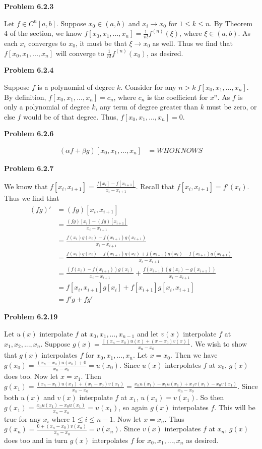 \documentclass{article}
\newcommand{\Problem}[1]{\textbf{Problem #1}}
\begin{document}
\Problem{6.2.3}

Let $f \in C^n[a,b]$. Suppose $x_0 \in (a,b)$ and $x_i \to x_0$ for $1 \leq k \leq n$. By Theorem 4 of the section, we know $f[x_0,x_1,...,x_n] = \frac{1}{n!}f^{(n)}(\xi)$, where $\xi \in (a,b)$. As each $x_i$ converges to $x_0$, it must be that $\xi \to x_0$ as well. Thus we find that $f[x_0,x_1,...,x_n]$ will converge to $\frac{1}{n!}f^{(n)}(x_0)$, as desired.

\Problem{6.2.4}

Suppose $f$ is a polynomial of degree $k$. Consider for any $n > k\ f[x_0,x_1,...,x_n]$. By definition, $f[x_0,x_1,...,x_n] = c_n$, where $c_n$ is the coefficient for $x^n$. As $f$ is only a polynomial of degree $k$, any term of degree greater than $k$ must be zero, or else $f$ would be of that degree. Thus, $f[x_0,x_1,...,x_n] = 0$. 

\Problem{6.2.6}

\begin{align*}
(\alpha f + \beta g)[x_0,x_1,...,x_n] &= WHO KNOWS	
\end{align*}

\Problem{6.2.7}

We know that $f[x_i,x_{i+1}] = \displaystyle\frac{f[x_i] - f[x_{i+1}]}{x_i - x_{i+1}}$. Recall that $f[x_i,x_{i+1}] = f'(x_i)$. Thus we find that
\begin{align*}
(fg)' &= (fg)[x_i,x_{i+1}]\\ 
&= \displaystyle\frac{(fg)[x_i] - (fg)[x_{i+1}]}{x_i - x_{i+1}}	\\
&= \displaystyle\frac{f(x_i)g(x_i) - f(x_{i+1})g(x_{i+1})}{x_i-x_{i+1}}\\
&= \displaystyle\frac{f(x_i)g(x_i) -f(x_{i+1})g(x_i)+f(x_{i+1})g(x_i)- f(x_{i+1})g(x_{i+1})}{x_i-x_{i+1}}\\
&= \displaystyle\frac{(f(x_i)-f(x_{i+1}))g(x_i)}{x_i-x_{i+1}} + \displaystyle\frac{f(x_{i+1})(g(x_i)-g(x_{i+1}))}{x_i-x_{i+1}}\\
&= f[x_i,x_{i+1}]g[x_i] + f[x_{i+1}]g[x_i,x_{i+1}]\\
&= f'g + fg'
\end{align*}

\Problem{6.2.19}

Let $u(x)$ interpolate $f$ at $x_0,x_1,...,x_{n-1}$ and let $v(x)$ interpolate $f$ at $x_1,x_2,...,x_n$. Suppose $g(x) = \displaystyle\frac{[(x_n - x_0)u(x) + (x - x_0)v(x)]}{x_n-x_0}$. We wish to show that $g(x)$ interpolates $f$ for $x_0,x_1,...,x_n$. Let $x = x_0$. Then we have $g(x_0) = \displaystyle\frac{(x_n - x_0)u(x_0) + 0}{x_n - x_0} = u(x_0)$. Since $u(x)$ interpolates $f$ at $x_0$, $g(x)$ does too. Now let $x = x_1$. Then $g(x_1) = \displaystyle\frac{(x_n - x_1)u(x_1) + (x_1-x_0)v(x_1)}{x_n - x_0} = \displaystyle\frac{x_nu(x_1)-x_1u(x_1) + x_1v(x_1) - x_0v(x_1)}{x_n - x_0}$. Since both $u(x)$ and $v(x)$ interpolate $f$ at $x_1$, $u(x_1) = v(x_1)$. So then $g(x_1) = \displaystyle\frac{x_nu(x_1) - x_0u(x_1)}{x_n - x_0} = u(x_1)$, so again $g(x)$ interpolates $f$. This will be true for any $x_i$ where $1 \leq i \leq n-1$. Now let $x = x_n$. Thus $g(x_n) = \displaystyle\frac{0 + (x_n-x_0)v(x_n)}{x_n-x_0} = v(x_n)$. Since $v(x)$ interpolates $f$ at $x_n$, $g(x)$ does too and in turn $g(x)$ interpolates $f$ for $x_0,x_1,...,x_n$ as desired.
\end{document}
